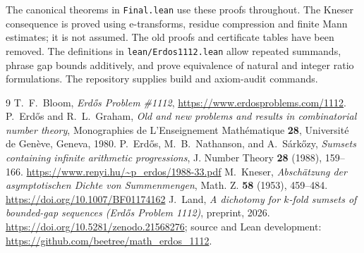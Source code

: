 \documentclass[11pt,a4paper,reqno]{amsart}
\theoremstyle{definition}
\theoremstyle{remark}
\begin{document}
The canonical theorems in \texttt{Final.lean} use these proofs throughout.
The Kneser consequence is proved using e-transforms, residue compression and
finite Mann estimates; it is not assumed. The old proofs and certificate tables
have been removed. The definitions in \texttt{lean/Erdos1112.lean} allow repeated
summands, phrase gap bounds additively, and prove equivalence of natural and
integer ratio formulations. The repository supplies build and axiom-audit commands.

\begin{thebibliography}{9}
 T.~F.~Bloom, \emph{Erd\H{o}s Problem \#1112},
\url{https://www.erdosproblems.com/1112}.
 P.~Erd\H{o}s and R.~L.~Graham,
\emph{Old and new problems and results in combinatorial number theory},
Monographies de L'Enseignement Math\'ematique \textbf{28},
Universit\'e de Gen\`eve, Geneva, 1980.
 P.~Erd\H{o}s, M.~B.~Nathanson, and A.~S\'ark\H{o}zy,
\emph{Sumsets containing infinite arithmetic progressions},
J. Number Theory \textbf{28} (1988), 159--166.
\url{https://www.renyi.hu/~p_erdos/1988-33.pdf}
 M.~Kneser,
\emph{Absch\"atzung der asymptotischen Dichte von Summenmengen},
Math. Z. \textbf{58} (1953), 459--484.
\url{https://doi.org/10.1007/BF01174162}
 J.~Land,
\emph{A dichotomy for $k$-fold sumsets of bounded-gap sequences
(Erd\H{o}s Problem 1112)}, preprint, 2026.
\url{https://doi.org/10.5281/zenodo.21568276}; source and Lean development:
\url{https://github.com/beetree/math_erdos_1112}.
\end{thebibliography}
\end{document}

